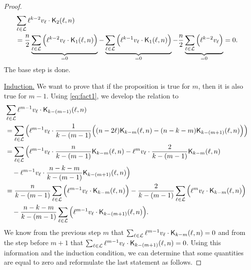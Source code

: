 \begin{proof}
    \begin{equation*}
    \begin{split}
        &\sum_{\ell \in \mathcal{L}} \ell^{k-2}v_\ell \cdot \mathsf{K}_{2}(\ell,n)\\
        &= \frac{n}{2}\underbrace{\sum_{\ell \in \mathcal{L}} \Big( \ell^{k-2}v_\ell \cdot \mathsf{K}_{1}(\ell,n) \Big)}_{=0} - \underbrace{\sum_{\ell \in \mathcal{L}} \Big( \ell^{k-1}v_\ell \cdot \mathsf{K}_{1}(\ell,n) \Big)}_{=0} - \frac{n}{2}\underbrace{\sum_{\ell \in \mathcal{L}} \Big( \ell^{k-2}v_\ell \Big)}_{=0} = 0.
    \end{split}
    \end{equation*}
    The base step is done.

    \underline{Induction.} We want to prove that if the proposition is true for $m$, then it is also true for $m - 1$. Using \cref{eq:fact1}, we develop the relation to
    \begin{equation*}
        \begin{split}
            & \sum_{\ell \in \mathcal{L}} \ell^{m-1}v_\ell \cdot \mathsf{K}_{k-(m-1)}(\ell,n)\\
            &= \sum_{\ell \in \mathcal{L}} \Big( \ell^{m-1}v_\ell \cdot \frac{1}{k-(m-1)}\Big( (n-2\ell)\mathsf{K}_{k-m}(\ell,n) - (n-k-m)\mathsf{K}_{k-(m+1)}(\ell,n) \Big)\Big)\\
            &= \sum_{\ell \in \mathcal{L}} \Big( \ell^{m-1}v_\ell \cdot \frac{n}{k-(m-1)}\mathsf{K}_{k-m}(\ell,n) - \ell^m v_\ell \cdot \frac{2}{k-(m-1)}\mathsf{K}_{k-m}(\ell,n)\\
            &\quad -\ell^{m-1}v_\ell \cdot\frac{n-k-m}{k-(m-1)}\mathsf{K}_{k-(m+1)}(\ell,n) \Big)\\
            &= \frac{n}{k-(m-1)}\sum_{\ell \in \mathcal{L}} \Big(\ell^{m-1}v_\ell\cdot \mathsf{K}_{k-m}(\ell,n) \Big) - \frac{2}{k-(m-1)}\sum_{\ell \in \mathcal{L}} \Big(\ell^mv_\ell\cdot \mathsf{K}_{k-m}(\ell,n)\Big)\\
            &\quad -\frac{n-k-m}{k-(m-1)}\sum_{\ell \in \mathcal{L}}\Big(\ell^{m-1}v_\ell\cdot \mathsf{K}_{k-(m+1)}(\ell,n)\Big).
        \end{split}
    \end{equation*}
    We know from the previous step $m$ that $\sum_{\ell \in \mathcal{L}} \ell^{m-1}v_\ell\cdot \mathsf{K}_{k-m}(\ell,n) = 0$ and from the step before $m+1$ that $\sum_{\ell \in \mathcal{L}} \ell^{m-1}v_\ell\cdot \mathsf{K}_{k-(m+1)}(\ell,n) = 0$.
    Using this information and the induction condition, we can determine that some quantities are equal to zero and reformulate the last statement as follows.


\end{proof}
